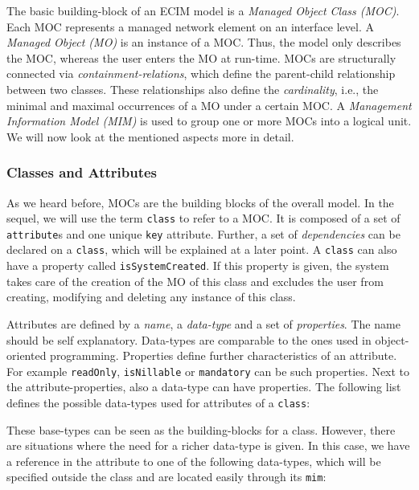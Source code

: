 The basic building-block of an ECIM model is a \emph{Managed Object Class (MOC)}. Each MOC represents a managed network element on an interface level. A \emph{Managed Object (MO)} is an instance of a MOC. Thus, the model only describes the MOC, whereas the user enters the MO at run-time. 
MOCs are structurally connected via \emph{containment-relations}, which define the parent-child relationship between two classes. These relationships also define the \emph{cardinality}, i.e., the minimal and maximal occurrences of a MO under a certain MOC. A \emph{Management Information Model (MIM)} is used to group one or more MOCs into a logical unit. We will now look at the mentioned aspects more in detail.


\subsubsection*{Classes and Attributes}

As we heard before, MOCs are the building blocks of the overall model. In the sequel, we will use the term \verb|class| to refer to a MOC. It is composed of a set of \verb|attribute|s and one unique \verb|key| attribute. Further, a set of  \emph{dependencies} can be declared on a \verb|class|, which will be explained at a later point.
A \verb|class| can also have a property called \verb|isSystemCreated|. If this property is given, the system takes care of the creation of the MO of this class and excludes the user from creating, modifying and deleting any instance of this class. 

Attributes are defined by a \emph{name}, a \emph{data-type} and a set of \emph{properties}. 
The name should be self explanatory. Data-types are comparable to the ones used in object-oriented programming. Properties define further characteristics of an attribute. For example \verb|readOnly|, \verb|isNillable| or \verb|mandatory| can be such properties. Next to the attribute-properties, also a data-type can have properties. The following list defines the possible data-types used for attributes of a \verb|class|:




These base-types can be seen as the building-blocks for a class. However, there are situations where the need for a richer data-type is given. In this case, we have a reference in the attribute to one of the following data-types, which will be specified outside the class and are located easily through its \verb|mim|:

